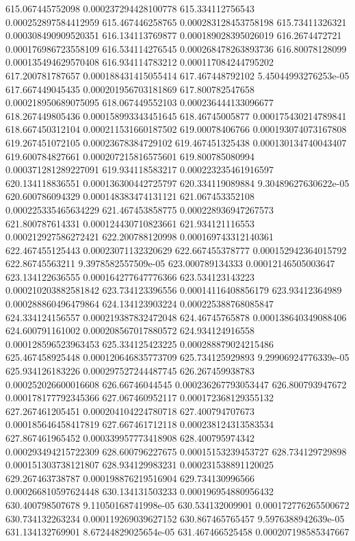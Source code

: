 {615.067445752098 0.000237294428100778
615.334112756543 0.000252897584412959
615.467446258765 0.000283128453758198
615.73411326321 0.000308490909520351
616.134113769877 0.000189028395026019
616.2674472721 0.000176986723558109
616.534114276545 0.000268478263893736
616.80078128099 0.000135494629570408
616.934114783212 0.000117084244795202
617.200781787657 0.000188431415055414
617.467448792102 5.45044993276253e-05
617.667449045435 0.000201956703181869
617.800782547658 0.000218950689075095
618.067449552103 0.000236444133096677
618.267449805436 0.000158993343451645
618.46745005877 0.000175430214789841
618.667450312104 0.000211531660187502
619.00078406766 0.000193074073167808
619.267451072105 0.00023678384729102
619.467451325438 0.000130134740043407
619.600784827661 0.000207215816575601
619.800785080994 0.000371281289227091
619.934118583217 0.000223235461916597
620.134118836551 0.000136300442725797
620.334119089884 9.30489627630622e-05
620.600786094329 0.000148383474131121
621.067453352108 0.000225335465634229
621.467453858775 0.000228936947267573
621.800787614331 0.000124430710823661
621.934121116553 0.000212927586272421
622.200788120998 0.000169743312140361
622.467455125443 0.00023071132320629
622.667455378777 0.000152942364015792
622.86745563211 9.3978582557509e-05
623.000789134333 0.00012146505003647
623.134122636555 0.000164277647776366
623.534123143223 0.000210203882581842
623.734123396556 0.00014116408856179
623.93412364989 0.000288860496479864
624.134123903224 0.000225388768085847
624.334124156557 0.000219387832472048
624.46745765878 0.000138640349088406
624.600791161002 0.000208567017880572
624.934124916558 0.000128596523963453
625.334125423225 0.000288879024215486
625.467458925448 0.000120646835773709
625.734125929893 9.29906924776339e-05
625.934126183226 0.000297527244487745
626.267459938783 0.000252026600016608
626.66746044545 0.000236267793053447
626.800793947672 0.000178177792345366
627.067460952117 0.000172368129355132
627.267461205451 0.000204104224780718
627.400794707673 0.000185646458417819
627.667461712118 0.000238124313583534
627.867461965452 0.000339957773418908
628.400795974342 0.000293494215722309
628.600796227675 0.00015153239453727
628.734129729898 0.000151303738121807
628.934129983231 0.000231538891120025
629.267463738787 0.000198876219516904
629.734130996566 0.000266810597624448
630.134131503233 0.000196954880956432
630.400798507678 9.11050168741998e-05
630.534132009901 0.000172776265500672
630.734132263234 0.000119269039627152
630.867465765457 9.5976388942639e-05
631.134132769901 8.67244829025654e-05
631.467466525458 0.000207198585347667
}
